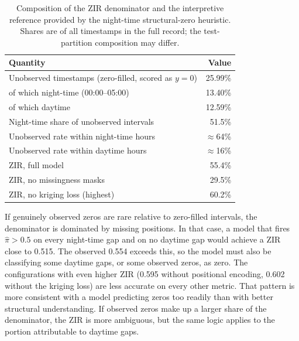 \begin{table}[htbp]
    \centering
    \caption[Interpretive bounds on ZIR]%
    {Composition of the ZIR denominator and the interpretive
    reference provided by the night-time structural-zero heuristic.
    Shares are of all timestamps in the full record; the test-partition
    composition may differ.}
    \label{tab:exp3-zero-bound}
    \small
    \begin{tabular}{@{}lr@{}}
        \toprule
        \textbf{Quantity} & \textbf{Value} \\
        \midrule
        Unobserved timestamps (zero-filled, scored as $y=0$) & 25.99\% \\
        \quad of which night-time (00:00--05:00)              & 13.40\% \\
        \quad of which daytime                                & 12.59\% \\
        Night-time share of unobserved intervals              & 51.5\% \\
        Unobserved rate within night-time hours               & $\approx$64\% \\
        Unobserved rate within daytime hours                  & $\approx$16\% \\
        \midrule
        ZIR, full model                               & 55.4\% \\
        ZIR, no missingness masks                     & 29.5\% \\
        ZIR, no kriging loss (highest)                & 60.2\% \\
        \bottomrule
    \end{tabular}
\end{table}

If genuinely observed zeros are rare relative to zero-filled intervals,
the denominator is dominated by missing positions. In that case, a model
that fires $\hat{\pi} > 0.5$ on every night-time gap and on no daytime
gap would achieve a ZIR close to 0.515. The observed 0.554 exceeds
this, so the model must also be classifying some daytime gaps, or some
observed zeros, as zero. The configurations with even higher ZIR
(0.595 without positional encoding, 0.602 without the kriging loss) are
less accurate on every other metric. That pattern is more consistent
with a model predicting zeros too readily than with better structural
understanding. If observed zeros make up a larger share of the
denominator, the ZIR is more ambiguous, but the same logic applies to
the portion attributable to daytime gaps.

